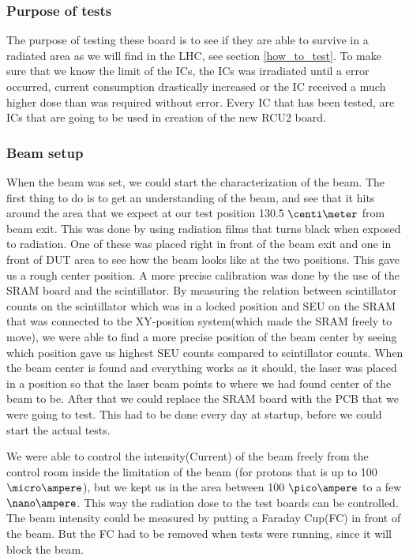 \documentclass[12pt]{article}
\numberwithin{figure}{section}
\begin{document}
\subsubsection{Purpose of tests}
The purpose of testing these board is to see if they are able to survive in a radiated area as we will find in the \ac{LHC}, see section \ref{how_to_test}.
To make sure that we know the limit of the \ac{IC}s, the \ac{IC}s was irradiated until a error occurred, current consumption drastically increased or the \ac{IC} received a much higher dose than was required without error.
Every \ac{IC} that has been tested, are ICs that are going to be used in creation of the new RCU2 board.

\subsubsection{Beam setup}
  \label{beam_setup}
When the beam was set, we could start the characterization of the beam.
The first thing to do is to get an understanding of the beam, and see that it hits around the area that we expect at our test position 130.5 $\centi\meter$ from beam exit.
This was done by using radiation films that turns black when exposed to radiation. 
One of these was placed right in front of the beam exit and one in front of \acf{DUT} area to see how the beam looks like at the two positions.
This gave us a rough center position. A more precise calibration was done by the use of the \ac{SRAM} board and the scintillator. 
By measuring the relation between scintillator counts on the scintillator which was in a locked position and SEU on the \ac{SRAM} that was connected to the XY-position system(which made the \ac{SRAM} freely to move), we were able to find a more precise position of the beam center by seeing which position gave us highest SEU counts compared to scintillator counts.
When the beam center is found and everything works as it should, the laser was placed in a position so that the laser beam points to where we had found center of the beam to be. After that we could replace the \ac{SRAM} board with the PCB that we were going to test. This had to be done every day at startup, before we could start the actual tests.

We were able to control the intensity(Current) of the beam freely from the control room inside the limitation of the beam (for protons that is up to 100 $\micro\ampere$), but we kept us in the area between 100 $\pico\ampere$ to a few $\nano\ampere$. This way the radiation dose to the test boards can be controlled. The beam intensity could be measured by putting a Faraday Cup(FC) in front of the beam. But the FC had to be removed when tests were running, since it will block the beam.
\end{document}

